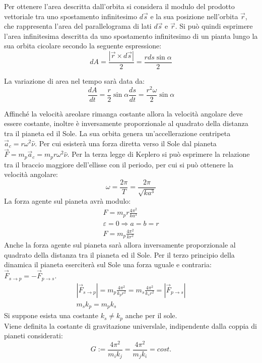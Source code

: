 \documentclass{article}
\numberwithin{equation}{subsection}
\begin{document}
Per ottenere l'area descritta dall'orbita si considera il modulo del prodotto vettoriale tra uno spostamento infinitesimo $d\vec{s}$ e la sua posizione nell'orbita $\vec{r}$, 
che rappresenta l'area del parallelograma di lati $d\vec{s}$ e $\vec{r}$. Si può quindi esprimere l'area infinitesima descritta da uno spostamento infinitesimo di un 
pianta lungo la sua orbita cicolare secondo la seguente espressione: 
\begin{equation*}
    dA=\displaystyle\frac{|\vec{r}\times d\vec{s}|}{2}=\frac{rds\sin\alpha}{2}
\end{equation*}

La variazione di area nel tempo sarà data da:
\begin{equation*}
    \displaystyle\frac{dA}{dt}=\frac{r}{2}\sin\alpha\frac{d{s}}{dt}=\frac{r^2\omega}{2}\sin\alpha
\end{equation*}

Affinché la velocità areolare rimanga costante allora la velocità angolare deve essere costante, inoltre è inversamente proporzionale al quadrato della distanza 
tra il pianeta ed il Sole. La sua orbita genera un'accellerazione centripeta $\vec{a}_c=r\omega^2\hat{\nu}$. Per cui esisterà una forza diretta verso 
il Sole dal pianeta $\vec{F}=m_p\vec{a}_c=m_pr\omega^2\hat{\nu}$. Per la terza legge di Keplero si può esprimere la relazione tra il braccio maggiore
dell'ellisse con il periodo, per cui si può ottenere la velocità angolare: 
\begin{equation*}
    \omega=\displaystyle\frac{2\pi}{T}=\frac{2\pi}{\sqrt{ka^3}}
\end{equation*}
La forza agente sul pianeta avrà modulo:
\begin{gather*}
    F=m_pr\displaystyle\frac{4\pi^2}{ka^3}\\
    \varepsilon=0\Rightarrow a=b=r\\
    F=m_p\displaystyle\frac{4\pi^2}{kr^2}
\end{gather*}
Anche la forza agente sul pianeta sarà allora inversamente proporzionale al quadrato della distanza tra il pianeta ed il Sole. Per il terzo 
principio della dinamica il pianeta eserciterà sul Sole una forza uguale e contraria: $\vec{F}_{s\to p}=-\vec{F}_{p\to s}$. 
\begin{gather*}
    \left|\vec{F}_{s\to p}\right|=m_p\displaystyle\frac{4\pi^2}{k_pr^2}=m_s\displaystyle\frac{4\pi^2}{k_sr^2}=\left|\vec{F}_{p\to s}\right|\\
    m_sk_p=m_pk_s
\end{gather*}
Si suppone esista una costante $k_s\neq k_p$ anche per il sole. 
\\
Viene definita la costante di gravitazione universlale, indipendente dalla coppia di pianeti considerati:
\begin{equation}
    G:=\displaystyle\frac{4\pi^2}{m_ik_j}=\frac{4\pi^2}{m_jk_i}=cost.
\end{equation}
\end{document}
